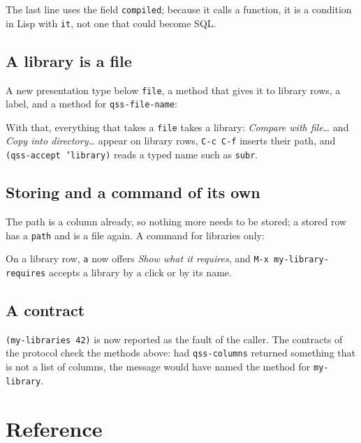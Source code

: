 \documentclass[
  paper=a4, fontsize=11pt, parskip=half, headings=small,
  toc=bibliography, numbers=noenddot, DIV=12
]{scrreprt}
\newcommand{\code}[1]{\texttt{#1}}
\newcommand{\kbd}[1]{\texttt{#1}}
\begin{document}
The last line uses the field \code{compiled}; because it calls a function, it
is a condition in Lisp with \code{it}, not one that could become SQL.

\section{A library is a file}

A new presentation type below \code{file}, a method that gives it to library
rows, a label, and a method for \code{qss-file-name}:



With that, everything that takes a \code{file} takes a library: \emph{Compare
with file\ldots} and \emph{Copy into directory\ldots} appear on library rows,
\kbd{C-c C-f} inserts their path, and \code{(qss-accept 'library)} reads a
typed name such as \code{subr}.

\section{Storing and a command of its own}

The path is a column already, so nothing more needs to be stored; a stored row
has a \code{path} and is a file again. A command for libraries only:




On a library row, \kbd{a} now offers \emph{Show what it requires}, and
\kbd{M-x my-library-requires} accepts a library by a click or by its name.

\section{A contract}



\code{(my-libraries 42)} is now reported as the fault of the caller. The
contracts of the protocol check the methods above: had \code{qss-columns}
returned something that is not a list of columns, the message would have named
the method for \code{my-library}.

\chapter{Reference}\label{chap:reference}
\end{document}
